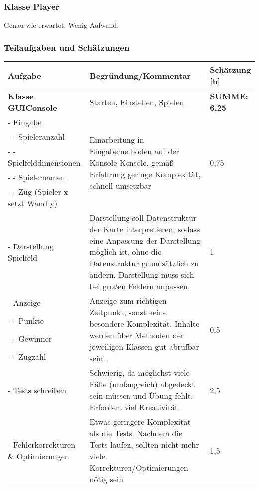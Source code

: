 \documentclass[a4paper,10pt]{article}
\begin{document}
\subsubsection*{Klasse Player}
Genau wie erwartet. Wenig Aufwand.

\subsubsection*{Teilaufgaben und Schätzungen}
\begin{tabular}{|p{}|p{}|p{}|}
 \hline
 \textbf{Aufgabe} & \textbf{Begründung/Kommentar} & \textbf{Schätzung [h]} \\
 \hline


 \textbf{Klasse GUIConsole} & Starten, Einstellen, Spielen & \textbf{SUMME: 6,25}\\
 \hline
 \-- Eingabe & \multirow{5}{0.4\textwidth}{Einarbeitung in Eingabemethoden auf der Konsole Konsole, gemäß Erfahrung geringe Komplexität, schnell umsetzbar} & \multirow{5}{0.15\textwidth}{0,75} \\
 \-- \-- Spieleranzahl & &\\
 \-- \-- Spielfelddimensionen & &\\
 \-- \-- Spielernamen & &\\
 \-- \-- Zug (Spieler x setzt Wand y) & &\\
 \hline
 \-- Darstellung Spielfeld & Darstellung soll Datenstruktur der Karte interpretieren, sodass eine Anpassung der Darstellung möglich ist, ohne die Datenstruktur grundsätzlich zu ändern. Darstellung muss sich bei großen Feldern anpassen. & 1 \\
 \hline
 \-- Anzeige & \multirow{4}{0.4\textwidth}{Anzeige zum richtigen Zeitpunkt, sonst keine besondere Komplexität. Inhalte werden über Methoden der jeweiligen Klassen gut abrufbar sein.} & \multirow{4}{0.15\textwidth}{0,5} \\
 \-- \-- Punkte & &\\
 \-- \-- Gewinner & &\\
 \-- \-- Zugzahl & &\\
 \hline
 \--  Tests schreiben & Schwierig, da möglichst viele Fälle (umfangreich) abgedeckt sein müssen und Übung fehlt. Erfordert viel Kreativität. & 2,5\\
 \hline
 \-- Fehlerkorrekturen \& Optimierungen & Etwas geringere Komplexität als die Tests. Nachdem die Tests laufen, sollten nicht mehr viele Korrekturen/Optimierungen nötig sein & 1,5\\

\end{tabular}
\end{document}
